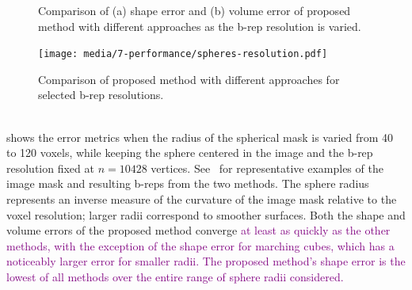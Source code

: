 \begin{figure}[h!]
\centering
{}
%	
\caption{Comparison of (a) shape error and (b) volume error of proposed method with different approaches as the b-rep resolution is varied.}
\label{fig:graph1}
\end{figure}
\begin{figure}[ht!]
	\centering
	\texttt{[image: media/7-performance/spheres-resolution.pdf]}
	\caption{Comparison of proposed method with different approaches for selected b-rep resolutions.}
	\label{fig:demos1}
\end{figure} \\
%
 shows the error metrics when the radius of the spherical mask is varied from 40 to 120 voxels, while keeping the sphere centered in the image and the b-rep resolution fixed at $n = 10428$ vertices. See~ for representative examples of the image mask and resulting b-reps from the two methods. The sphere radius represents an inverse measure of the curvature of the image mask relative to the voxel resolution; larger radii correspond to smoother surfaces. Both the shape and volume errors of the proposed method converge \textcolor{purple}{at least as quickly as the other methods, with the exception of the shape error for marching cubes, which has a noticeably larger error for smaller radii. The proposed method's shape error is the lowest of all methods over the entire range of sphere radii considered.}

